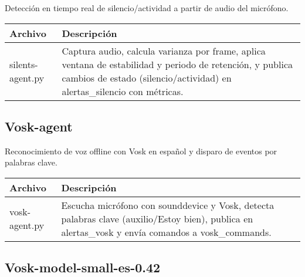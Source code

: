 Detección en tiempo real de silencio/actividad a partir de audio del micrófono.

\begin{table}[H]
  \doublespacing
  \begin{tabularx}{\textwidth}{l X}
    \hline
    \textbf{Archivo} & \textbf{Descripción} \\
    \hline
    silents-agent.py &
    Captura audio, calcula varianza por frame, aplica ventana de estabilidad y periodo de retención, y publica cambios de estado (silencio/actividad) en alertas\_silencio con métricas.
    \\
    \hline
  \end{tabularx}
\end{table}

\subsection*{Vosk-agent}

Reconocimiento de voz offline con Vosk en español y disparo de eventos por palabras clave.

\begin{table}[H]
  \doublespacing
  \begin{tabularx}{\textwidth}{l X}
    \hline
    \textbf{Archivo} & \textbf{Descripción} \\
    \hline
    vosk-agent.py    &
    Escucha micrófono con sounddevice y Vosk, detecta palabras clave (auxilio/Estoy bien), publica en alertas\_vosk y envía comandos a vosk\_commands.
    \\
    \hline
  \end{tabularx}
\end{table}

\subsection*{Vosk-model-small-es-0.42}


